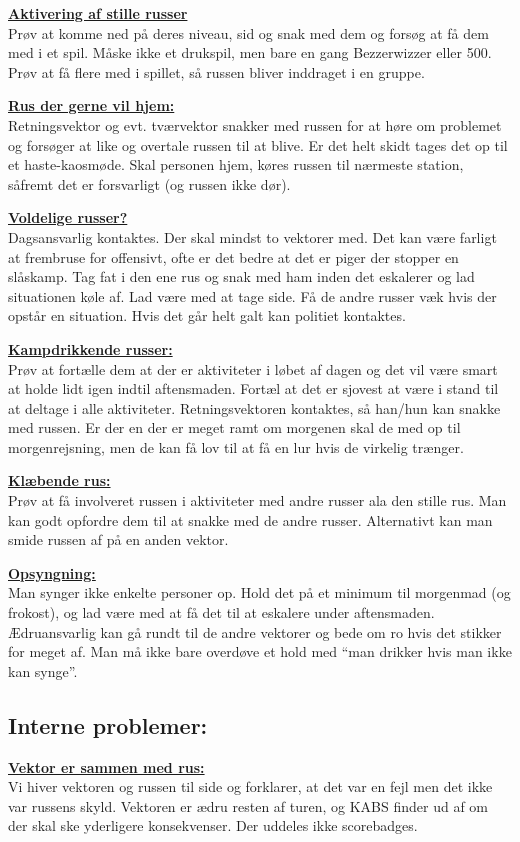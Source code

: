 \underline{\textbf{Aktivering af stille russer}}\\
Prøv at komme ned på deres niveau, sid og snak med dem og forsøg at få dem med i et spil. Måske ikke et drukspil, men bare en gang Bezzerwizzer eller 500. Prøv at få flere med i spillet, så russen bliver inddraget i en gruppe.

\underline{\textbf{Rus der gerne vil hjem:}}\\
Retningsvektor og evt. tværvektor snakker med russen for at høre om problemet og forsøger at like og overtale russen til at blive. Er det helt skidt tages det op til et haste-kaosmøde. Skal personen hjem, køres russen til nærmeste station, såfremt det er forsvarligt (og russen ikke dør). 

\underline{\textbf{Voldelige russer?}}\\
Dagsansvarlig kontaktes. Der skal mindst to vektorer med. Det kan være farligt at frembruse for offensivt, ofte er det bedre at det er piger der stopper en slåskamp. Tag fat i den ene rus og snak med ham inden det eskalerer og lad situationen køle af. Lad være med at tage side. Få de andre russer væk hvis der opstår en situation. Hvis det går helt galt kan politiet kontaktes.

\underline{\textbf{Kampdrikkende russer:}}\\
Prøv at fortælle dem at der er aktiviteter i løbet af dagen og det vil være smart at holde lidt igen indtil aftensmaden. Fortæl at det er sjovest at være i stand til at deltage i alle aktiviteter. Retningsvektoren kontaktes, så han/hun kan snakke med russen. Er der en der er meget ramt om morgenen skal de med op til morgenrejsning, men de kan få lov til at få en lur hvis de virkelig trænger. 

\underline{\textbf{Klæbende rus:}}\\
Prøv at få involveret russen i aktiviteter med andre russer ala den stille rus. Man kan godt opfordre dem til at snakke med de andre russer. Alternativt kan man smide russen af på en anden vektor.

\underline{\textbf{Opsyngning:}}\\
Man synger ikke enkelte personer op. Hold det på et minimum til morgenmad (og frokost), og lad være med at få det til at eskalere under aftensmaden. Ædruansvarlig kan gå rundt til de andre vektorer og bede om ro hvis det stikker for meget af. Man må ikke bare overdøve et hold med ``man drikker hvis man ikke kan synge''.
\subsection*{Interne problemer:}
\underline{\textbf{Vektor er sammen med rus:}}\\
Vi hiver vektoren og russen til side og forklarer, at det var en fejl men det ikke var russens skyld. Vektoren er ædru resten af turen, og KABS finder ud af om der skal ske yderligere konsekvenser. Der uddeles ikke scorebadges.

